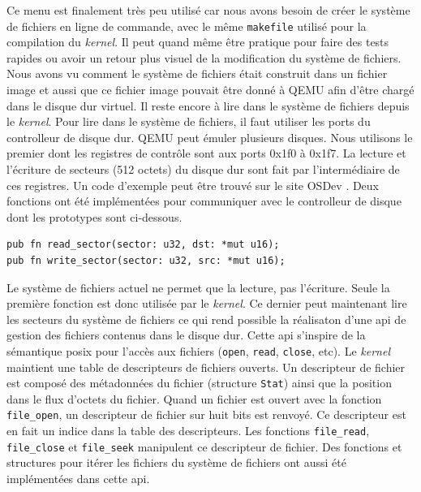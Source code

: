 Ce menu est finalement très peu utilisé car nous avons besoin de créer le système
de fichiers en ligne de commande, avec le même \texttt{makefile} utilisé
pour la compilation du \textit{kernel}. Il peut quand même être pratique pour faire
des tests rapides ou avoir un retour plus visuel de la modification
du système de fichiers. Nous avons vu comment le système de fichiers était construit
dans un fichier image et aussi que ce fichier image pouvait être donné à QEMU afin
d'être chargé dans le disque dur virtuel. Il reste encore à lire dans le système
de fichiers depuis le \textit{kernel}. Pour lire dans le système de fichiers, il
faut utiliser les ports du controlleur de disque dur. QEMU peut émuler plusieurs
disques. Nous utilisons le premier dont les registres de contrôle sont aux ports
0x1f0 à 0x1f7. La lecture et l'écriture de secteurs (512 octets) du disque dur
sont fait par l'intermédiaire de ces registres. Un code d'exemple peut être trouvé
sur le site OSDev \cite{ref24}. Deux fonctions ont été implémentées pour communiquer
avec le controlleur de disque dont les prototypes sont ci-dessous.

\begin{verbatim}
pub fn read_sector(sector: u32, dst: *mut u16);
pub fn write_sector(sector: u32, src: *mut u16);
\end{verbatim}

Le système de fichiers actuel ne permet que la lecture, pas l'écriture.
Seule la première fonction est donc utilisée par le \textit{kernel}. Ce dernier
peut maintenant lire les secteurs du système de fichiers ce qui rend possible
la réalisaton d'une \acrshort{api} de gestion des fichiers contenus dans le disque dur.
Cette \acrshort{api} s'inspire de la sémantique \acrshort{posix} pour l'accès aux
fichiers (\texttt{open}, \texttt{read}, \texttt{close},
etc). Le \textit{kernel} maintient une table de descripteurs de fichiers ouverts.
Un descripteur de fichier est composé des métadonnées du fichier (structure
\texttt{Stat}) ainsi que la position dans le flux d'octets du fichier.
Quand un fichier est ouvert avec la fonction \texttt{file_open}, un descripteur
de fichier sur huit bits est renvoyé. Ce descripteur est en fait un indice dans
la table des descripteurs. Les fonctions \texttt{file_read},
\texttt{file_close} et \texttt{file_seek} manipulent
ce descripteur de fichier. Des fonctions et structures pour itérer les fichiers
du système de fichiers ont aussi été implémentées dans cette \acrshort{api}.